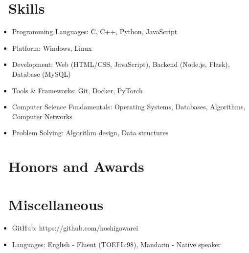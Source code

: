 \documentclass{resume}
\begin{document}
\section{\faCogs\ Skills}
\begin{itemize}[parsep=0.5ex]
  \item Programming Languages: C, C++, Python, JavaScript
  \item Platform: Windows, Linux
  \item Development: Web (HTML/CSS, JavaScript), Backend (Node.js, Flask), Database (MySQL)
  \item Tools \& Frameworks: Git, Docker, PyTorch
  \item Computer Science Fundamentals: Operating Systems, Databases, Algorithms, Computer Networks
  \item Problem Solving: Algorithm design, Data structures
\end{itemize}

\section{\faHeartO\ Honors and Awards}

\section{\faInfo\ Miscellaneous}
\begin{itemize}[parsep=0.5ex]
  \item GitHub: https://github.com/hoshigawarei
  \item Languages: English - Fluent (TOEFL:98), Mandarin - Native speaker
\end{itemize}

%
%
\end{document}
